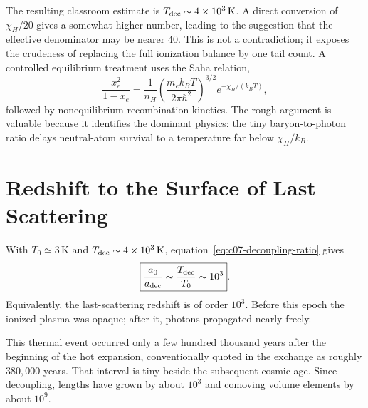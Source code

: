 \begin{classroomqa}
\end{classroomqa}

The resulting classroom estimate is \(T_{\rm dec}\sim4\times10^3\,\mathrm{K}\). A direct conversion of \(\chi_H/20\) gives a somewhat higher number, leading to the suggestion that the effective denominator may be nearer \(40\). This is not a contradiction; it exposes the crudeness of replacing the full ionization balance by one tail count. A controlled equilibrium treatment uses the Saha relation,
\begin{equation}
\frac{x_e^2}{1-x_e}
=
\frac{1}{n_H}
\left(\frac{m_e k_BT}{2\pi\hbar^2}\right)^{3/2}
e^{-\chi_H/(k_BT)},
\label{eq:c07-saha}
\end{equation}
followed by nonequilibrium recombination kinetics. The rough argument is valuable because it identifies the dominant physics: the tiny baryon-to-photon ratio delays neutral-atom survival to a temperature far below \(\chi_H/k_B\).

\section{Redshift to the Surface of Last Scattering}

With \(T_0\simeq3\,\mathrm{K}\) and \(T_{\rm dec}\sim4\times10^3\,\mathrm{K}\), equation~\eqref{eq:c07-decoupling-ratio} gives
\begin{equation}
\boxed{
\frac{a_0}{a_{\rm dec}}
\sim
\frac{T_{\rm dec}}{T_0}
\sim10^3
}.
\label{eq:c07-decoupling-expansion}
\end{equation}
Equivalently, the last-scattering redshift is of order \(10^3\). Before this epoch the ionized plasma was opaque; after it, photons propagated nearly freely.

This thermal event occurred only a few hundred thousand years after the beginning of the hot expansion, conventionally quoted in the exchange as roughly \(380{,}000\) years. That interval is tiny beside the subsequent cosmic age. Since decoupling, lengths have grown by about \(10^3\) and comoving volume elements by about \(10^9\).

